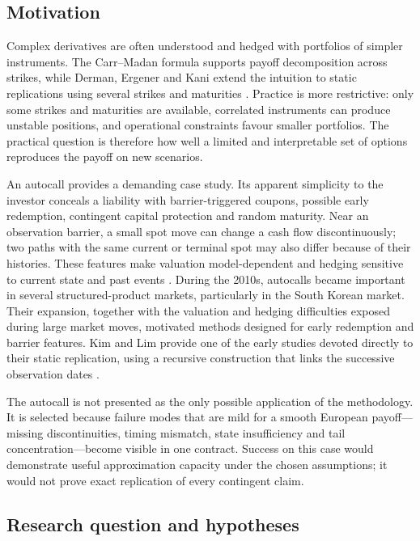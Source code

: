 \documentclass[12pt,a4paper]{article}
\newcommand{\1}{\mathbf{1}}
\begin{document}
\subsection{Motivation}

Complex derivatives are often understood and hedged with portfolios of simpler instruments. The Carr--Madan formula supports payoff decomposition across strikes, while Derman, Ergener and Kani extend the intuition to static replications using several strikes and maturities \cite{carrmadan1998,derman1995}. Practice is more restrictive: only some strikes and maturities are available, correlated instruments can produce unstable positions, and operational constraints favour smaller portfolios. The practical question is therefore how well a limited and interpretable set of options reproduces the payoff on new scenarios.

An autocall provides a demanding case study. Its apparent simplicity to the investor conceals a liability with barrier-triggered coupons, possible early redemption, contingent capital protection and random maturity. Near an observation barrier, a small spot move can change a cash flow discontinuously; two paths with the same current or terminal spot may also differ because of their histories. These features make valuation model-dependent and hedging sensitive to current state and past events \cite{guillaume2015}. During the 2010s, autocalls became important in several structured-product markets, particularly in the South Korean market. Their expansion, together with the valuation and hedging difficulties exposed during large market moves, motivated methods designed for early redemption and barrier features. Kim and Lim provide one of the early studies devoted directly to their static replication, using a recursive construction that links the successive observation dates \cite{kimlim2019}.

The autocall is not presented as the only possible application of the methodology. It is selected because failure modes that are mild for a smooth European payoff---missing discontinuities, timing mismatch, state insufficiency and tail concentration---become visible in one contract. Success on this case would demonstrate useful approximation capacity under the chosen assumptions; it would not prove exact replication of every contingent claim.

\subsection{Research question and hypotheses}
\end{document}
